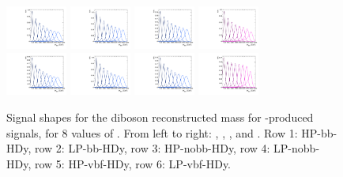 \begin{figure}[htbp]
  \includegraphics[width=0.18\textwidth]{fig/analysis/templateSignalVsMX_fromDC_VBFGbuToWW_MVV_mu_HP_vbf_DEtaHi.pdf}
  \includegraphics[width=0.18\textwidth]{fig/analysis/templateSignalVsMX_fromDC_VBFRadToWW_MVV_mu_HP_vbf_DEtaHi.pdf}
  \includegraphics[width=0.18\textwidth]{fig/analysis/templateSignalVsMX_fromDC_VBFZprToWW_MVV_mu_HP_vbf_DEtaHi.pdf}
  \includegraphics[width=0.18\textwidth]{fig/analysis/templateSignalVsMX_fromDC_VBFWprToWZ_MVV_mu_HP_vbf_DEtaHi.pdf}\\
  \includegraphics[width=0.18\textwidth]{fig/analysis/templateSignalVsMX_fromDC_VBFGbuToWW_MVV_mu_LP_vbf_DEtaHi.pdf}
  \includegraphics[width=0.18\textwidth]{fig/analysis/templateSignalVsMX_fromDC_VBFRadToWW_MVV_mu_LP_vbf_DEtaHi.pdf}
  \includegraphics[width=0.18\textwidth]{fig/analysis/templateSignalVsMX_fromDC_VBFZprToWW_MVV_mu_LP_vbf_DEtaHi.pdf}
  \includegraphics[width=0.18\textwidth]{fig/analysis/templateSignalVsMX_fromDC_VBFWprToWZ_MVV_mu_LP_vbf_DEtaHi.pdf}\\
  \caption{
    Signal shapes for the diboson reconstructed mass \MVV for \VBF-produced signals, for 8 values of \MX.
    From left to right: \GBulktoWW, \RadtoWW, \ZprtoWW, and \WprtoWZ.
    Row 1: HP-bb-HDy, row 2: LP-bb-HDy, row 3: HP-nobb-HDy, row 4: LP-nobb-HDy, row 5: HP-vbf-HDy, row 6: LP-vbf-HDy.
  }
  \label{fig:MVVShapes_VBF_HDy_Run2}
\end{figure}

